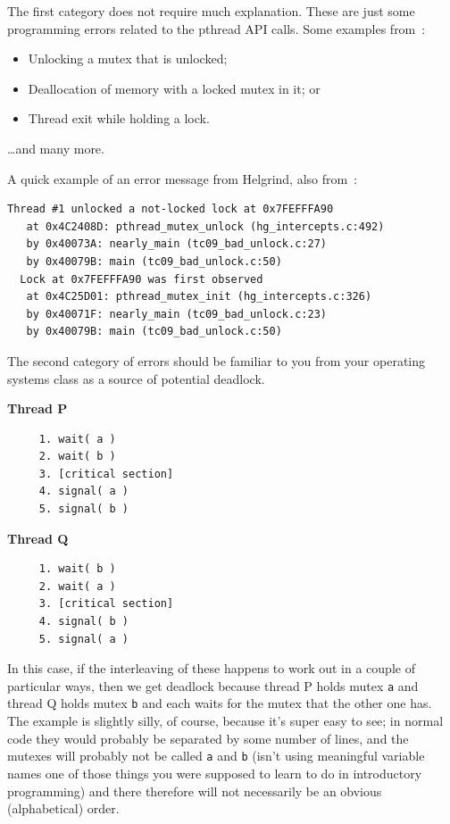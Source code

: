 \documentclass[a4paper]{report}
\begin{document}
The first category does not require much explanation. These are just some programming errors related to the pthread API calls. Some examples from~\cite{helgrind}:

\begin{itemize}[noitemsep]
	\item Unlocking a mutex that is unlocked;
	\item Deallocation of memory with a locked mutex in it; or
	\item Thread exit while holding a lock.
\end{itemize}
\ldots and many more.

A quick example of an error message from Helgrind, also from~\cite{helgrind}:

\begin{verbatim}
Thread #1 unlocked a not-locked lock at 0x7FEFFFA90
   at 0x4C2408D: pthread_mutex_unlock (hg_intercepts.c:492)
   by 0x40073A: nearly_main (tc09_bad_unlock.c:27)
   by 0x40079B: main (tc09_bad_unlock.c:50)
  Lock at 0x7FEFFFA90 was first observed
   at 0x4C25D01: pthread_mutex_init (hg_intercepts.c:326)
   by 0x40071F: nearly_main (tc09_bad_unlock.c:23)
   by 0x40079B: main (tc09_bad_unlock.c:50)
\end{verbatim}



The second category of errors should be familiar to you from your operating systems class as a source of potential deadlock.

\begin{multicols}{2}
\textbf{Thread P}\vspace{-2em}
  \begin{verbatim}
	 1. wait( a ) 
	 2. wait( b )
	 3. [critical section]
	 4. signal( a )
	 5. signal( b )
  \end{verbatim}
\columnbreak
\textbf{Thread Q}\vspace{-2em}
  \begin{verbatim}
	 1. wait( b ) 
	 2. wait( a )
	 3. [critical section]
	 4. signal( b )
	 5. signal( a )
  \end{verbatim}
\end{multicols}
\vspace{-2em}

In this case, if the interleaving of these happens to work out in a couple of particular ways, then we get deadlock because thread P holds mutex \texttt{a} and thread Q holds mutex \texttt{b} and each waits for the mutex that the other one has. The example is slightly silly, of course, because it's super easy to see; in normal code they would probably be separated by some number of lines, and the mutexes will probably not be called \texttt{a} and \texttt{b} (isn't using meaningful variable names one of those things you were supposed to learn to do in introductory programming\textinterrobang) and there therefore will not necessarily be an obvious (alphabetical) order.
\end{document}
